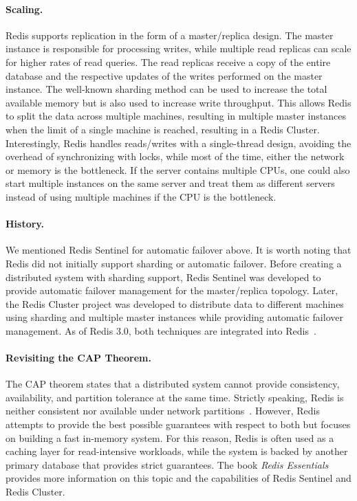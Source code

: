\paragraph{Scaling.} Redis supports replication in the form of a master/replica design. The master instance is responsible for processing writes, while multiple read replicas can scale for higher rates of read queries. The read replicas receive a copy of the entire database and the respective updates of the writes performed on the master instance. The well-known sharding method can be used to increase the total available memory but is also used to increase write throughput. This allows Redis to split the data across multiple machines, resulting in multiple master instances when the limit of a single machine is reached, resulting in a Redis Cluster. Interestingly, Redis handles reads/writes with a single-thread design, avoiding the overhead of synchronizing with locks, while most of the time, either the network or memory is the bottleneck. If the server contains multiple CPUs, one could also start multiple instances on the same server and treat them as different servers instead of using multiple machines if the CPU is the bottleneck.

\paragraph{History.} We mentioned Redis Sentinel for automatic failover above. It is worth noting that Redis did not initially support sharding or automatic failover. Before creating a distributed system with sharding support, Redis Sentinel was developed to provide automatic failover management for the master/replica topology. Later, the Redis Cluster project was developed to distribute data to different machines using sharding and multiple master instances while providing automatic failover management. As of Redis 3.0, both techniques are integrated into Redis~\cite{silva_redis_2015}.

\paragraph{Revisiting the CAP Theorem.} The CAP theorem states that a distributed system cannot provide consistency, availability, and partition tolerance at the same time. Strictly speaking, Redis is neither consistent nor available under network partitions~\cite{silva_redis_2015}. However, Redis attempts to provide the best possible guarantees with respect to both but focuses on building a fast in-memory system. For this reason, Redis is often used as a caching layer for read-intensive workloads, while the system is backed by another primary database that provides strict guarantees. The book \emph{Redis Essentials}~\cite{silva_redis_2015} provides more information on this topic and the capabilities of Redis Sentinel and Redis Cluster.

